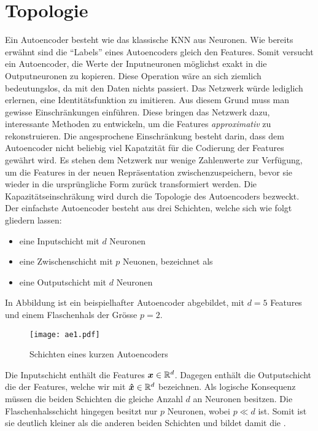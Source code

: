 \section{Topologie}
Ein Autoencoder besteht wie das klassische KNN aus Neuronen.
Wie bereits erwähnt sind die ``Labels'' eines Autoencoders gleich
den Features. Somit versucht ein Autoencoder, die Werte der Inputneuronen
möglichst exakt in die Outputneuronen zu kopieren.
Diese Operation wäre an sich ziemlich bedeutungslos, da mit den
Daten nichts passiert. Das Netzwerk würde lediglich erlernen, eine
Identitätsfunktion zu imitieren.
Aus diesem Grund muss man gewisse Einschränkungen einführen. Diese bringen das Netzwerk dazu,
interessante Methoden zu entwickeln, um die Features \textit{approximativ} zu rekonstruieren.
\para{}
Die angesprochene Einschränkung besteht darin, dass dem Autoencoder nicht
beliebig viel Kapatzität für die Codierung der Features gewährt wird.
Es stehen dem Netzwerk nur wenige Zahlenwerte zur Verfügung, um die Features
in der neuen Repräsentation zwischenzuspeichern, bevor sie wieder in die
ursprüngliche Form zurück transformiert werden.
Die Kapazitätseinschräkung wird durch die Topologie des Autoencoders bezweckt.
\para{}
\bigskip
Der einfachste Autoencoder besteht aus drei Schichten, welche sich wie folgt
gliedern lassen:
\begin{itemize}
\item{eine Inputschicht mit $d$ Neuronen}
\item{eine Zwischenschicht mit $p$ Neuonen, bezeichnet als }
\item{eine Outputschicht mit $d$ Neuronen}
\end{itemize}
In Abbildung  ist
ein beispielhafter Autoencoder abgebildet, mit $d = 5$ Features und einem
Flaschenhals der Grösse $p = 2$.
\begin{figure}[h!]
  \centering
  \texttt{[image: ae1.pdf]}
  \caption{Schichten eines kurzen Autoencoders}
  \label{fig:basic_autoencoder}
\end{figure}
\para{}
Die Inputschicht enthält die Features $\bm{x} \in \mathbb{R}^d$. Dagegen enthält die Outputschicht
die  der Features, welche wir mit $\bm{\hat{x}} \in \mathbb{R}^d$
bezeichnen. Als logische Konsequenz müssen die beiden Schichten die gleiche
Anzahl $d$ an Neuronen besitzen.
Die Flaschenhalsschicht hingegen besitzt nur $p$ Neuronen, wobei $p \ll d$ ist.
Somit ist sie deutlich kleiner als die anderen beiden Schichten und bildet
damit die .
